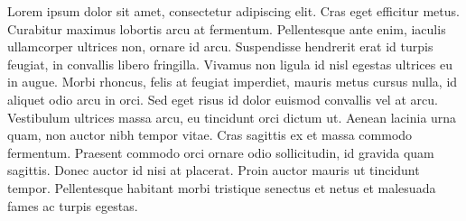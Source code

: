 \documentclass{article}
\begin{document}
Lorem ipsum dolor sit amet, consectetur adipiscing elit. Cras eget efficitur metus. Curabitur maximus lobortis arcu at fermentum. Pellentesque ante enim, iaculis ullamcorper ultrices non, ornare id arcu. Suspendisse hendrerit erat id turpis feugiat, in convallis libero fringilla. Vivamus non ligula id nisl egestas ultrices eu in augue. Morbi rhoncus, felis at feugiat imperdiet, mauris metus cursus nulla, id aliquet odio arcu in orci. Sed eget risus id dolor euismod convallis vel at arcu. Vestibulum ultrices massa arcu, eu tincidunt orci dictum ut. Aenean lacinia urna quam, non auctor nibh tempor vitae. Cras sagittis ex et massa commodo fermentum. Praesent commodo orci ornare odio sollicitudin, id gravida quam sagittis. Donec auctor id nisi at placerat. Proin auctor mauris ut tincidunt tempor. Pellentesque habitant morbi tristique senectus et netus et malesuada fames ac turpis egestas. 
\end{document}
